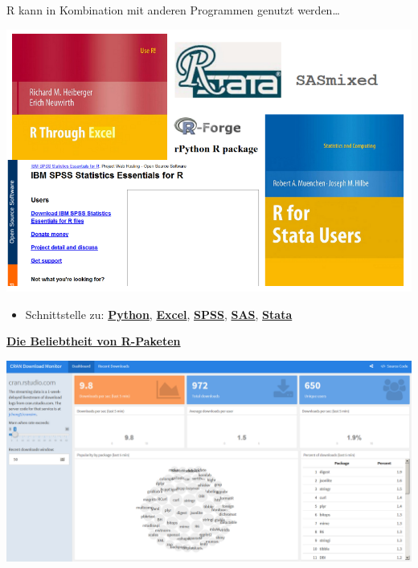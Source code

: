 \documentclass[ignorenonframetext,]{beamer}
\providecommand{\tightlist}{%
  \setlength{\itemsep}{0pt}\setlength{\parskip}{0pt}}
\begin{document}
\begin{frame}{R kann in Kombination mit anderen Programmen genutzt
werden\ldots{}}

\includegraphics{figure/Rinterfaces.PNG}

\begin{itemize}
\tightlist
\item
  Schnittstelle zu:
  \href{https://cran.r-project.org/web/packages/reticulate/vignettes/calling_python.html}{\textbf{Python}},
  \href{https://www.springer.com/de/book/9781441900517}{\textbf{Excel}},
  \href{https://www.ibm.com/support/knowledgecenter/en/SSFUEU_7.2.0/com.ibm.swg.ba.cognos.op_capmod_ig.7.2.0.doc/t_essentials_for_r_statistics.html}{\textbf{SPSS}},
  \href{https://cran.r-project.org/web/packages/SASmixed/index.html}{\textbf{SAS}},
  \href{https://cran.r-project.org/web/packages/RStata/index.html}{\textbf{Stata}}
\end{itemize}

\end{frame}

\begin{frame}{\href{https://gallery.shinyapps.io/cran-gauge/}{\textbf{Die
Beliebtheit von R-Paketen}}}

\includegraphics{figure/CRANdownloads.PNG}

\end{frame}
\end{document}
